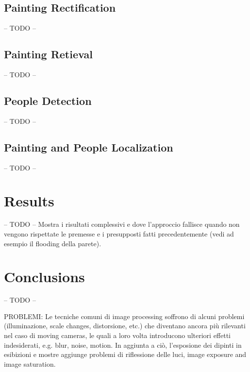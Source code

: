 \documentclass[10pt,twocolumn,letterpaper]{article}
\begin{document}
\subsection{Painting Rectification}
-- TODO --
\subsection{Painting Retieval}
-- TODO --
\subsection{People Detection}
-- TODO --
\subsection{Painting and People Localization}
-- TODO --

\section{Results}
-- TODO --
Mostra i risultati complessivi e dove l'approccio fallisce quando non vengono rispettate le premesse e i presupposti fatti precedentemente (vedi ad esempio il flooding della parete).

\section{Conclusions}
-- TODO --

PROBLEMI:
Le tecniche comuni di image processing soffrono di alcuni problemi (illuminazione, scale changes, distorsione, etc.) che diventano ancora più rilevanti nel caso di moving cameras, le quali a loro volta introducono ulteriori effetti indesiderati, e.g. blur, noise, motion. 
In aggiunta a ciò, l'esposione dei dipinti in esibizioni e mostre aggiunge problemi di riflessione delle luci, image exposure and image saturation.

{\small


}
\end{document}
